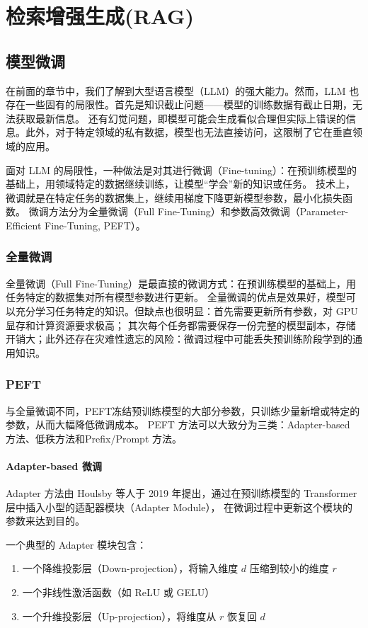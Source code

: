 \chapter{检索增强生成(RAG)}
\section{模型微调}
在前面的章节中，我们了解到大型语言模型（LLM）的强大能力。然而，LLM 也存在一些固有的局限性。首先是知识截止问题——模型的训练数据有截止日期，无法获取最新信息。
还有幻觉问题，即模型可能会生成看似合理但实际上错误的信息。此外，对于特定领域的私有数据，模型也无法直接访问，这限制了它在垂直领域的应用。

面对 LLM 的局限性，一种做法是对其进行微调（Fine-tuning）：在预训练模型的基础上，用领域特定的数据继续训练，让模型“学会”新的知识或任务。
技术上，微调就是在特定任务的数据集上，继续用梯度下降更新模型参数，最小化损失函数。
微调方法分为全量微调（Full Fine-Tuning）和参数高效微调（Parameter-Efficient Fine-Tuning, PEFT）。

\subsection{全量微调}
全量微调（Full Fine-Tuning）是最直接的微调方式：在预训练模型的基础上，用任务特定的数据集对所有模型参数进行更新。
全量微调的优点是效果好，模型可以充分学习任务特定的知识。但缺点也很明显：首先需要更新所有参数，对 GPU 显存和计算资源要求极高；
其次每个任务都需要保存一份完整的模型副本，存储开销大；此外还存在灾难性遗忘的风险：微调过程中可能丢失预训练阶段学到的通用知识。

\subsection{PEFT}
与全量微调不同，PEFT冻结预训练模型的大部分参数，只训练少量新增或特定的参数，从而大幅降低微调成本。
PEFT 方法可以大致分为三类：Adapter-based 方法、低秩方法和Prefix/Prompt 方法。

\subsubsection{Adapter-based 微调}
Adapter 方法由 Houlsby 等人于 2019 年提出，通过在预训练模型的 Transformer 层中插入小型的适配器模块（Adapter Module），
在微调过程中更新这个模块的参数来达到目的。

一个典型的 Adapter 模块包含：
\begin{enumerate}
	\item 一个降维投影层（Down-projection），将输入维度 $d$ 压缩到较小的维度 $r$
	\item 一个非线性激活函数（如 ReLU 或 GELU）
	\item 一个升维投影层（Up-projection），将维度从 $r$ 恢复回 $d$
\end{enumerate}

